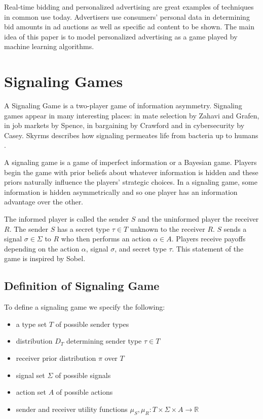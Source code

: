 \documentclass{article}
\begin{document}
Real-time bidding and personalized advertising are great examples of techniques in common use today. Advertisers use consumers' personal data in determining bid amounts in ad auctions as well as specific ad content to be shown. The main idea of this paper is to model personalized advertising as a game played by machine learning algorithms.

\section{Signaling Games}

A Signaling Game is a two-player game of information asymmetry. Signaling games appear in many interesting places: in mate selection by Zahavi\cite{zahavi1} and Grafen\cite{grafen1}, in job markets by Spence\cite{spence1}, in bargaining by Crawford\cite{crawford1982strategic} and in cybersecurity by Casey\cite{casey1}\cite{casey2}\cite{casey3}. Skyrms describes how signaling permeates life from bacteria up to humans \cite{skyrms2010signals}.

A signaling game is a game of imperfect information or a Bayesian game\cite{harsanyi2004games}. Players begin the game with prior beliefs about whatever information is hidden and these priors naturally influence the players' strategic choices. In a signaling game, some information is hidden asymmetrically and so one player has an information advantage over the other. 

The informed player is called the sender $S$ and the uninformed player the receiver $R$. The sender $S$ has a secret type $\tau \in T$ unknown to the receiver $R$. $S$ sends a signal $\sigma \in \Sigma$ to $R$ who then performs an action $\alpha \in A$. Players receive payoffs depending on the action $\alpha$, signal $\sigma$, and secret type $\tau$. This statement of the game is inspired by Sobel\cite{sobel1}.

\subsection{Definition of Signaling Game}
To define a signaling game we specify the following:
\begin{itemize}
    \item a type set $T$ of possible sender types
    \item distribution $D_T$ determining sender type $\tau \in T$
    \item receiver prior distribution $\pi$ over $T$
    \item signal set $\Sigma$ of possible signals
    \item action set $A$ of possible actions
    \item sender and receiver utility functions $\mu_S, \mu_R: T \times \Sigma \times A \longrightarrow \mathbb{R}$
\end{itemize}
\end{document}
